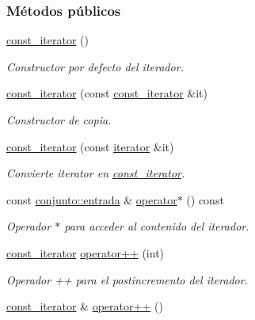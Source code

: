 \subsubsection*{Métodos públicos}
\begin{DoxyCompactItemize}
\item 
\hyperlink{classconjunto_1_1const__iterator_a9a4edb6eaa3bd1b3e3fab6111b5ebde9}{const\-\_\-iterator} ()
\begin{DoxyCompactList}\small\item\em Constructor por defecto del iterador. \end{DoxyCompactList}\item 
\hyperlink{classconjunto_1_1const__iterator_a1202d781e6061a7ce3bd9007b746f20a}{const\-\_\-iterator} (const \hyperlink{classconjunto_1_1const__iterator}{const\-\_\-iterator} \&it)
\begin{DoxyCompactList}\small\item\em Constructor de copia. \end{DoxyCompactList}\item 
\hyperlink{classconjunto_1_1const__iterator_ae54dfe6616579cac1d72c771766e5683}{const\-\_\-iterator} (const \hyperlink{classconjunto_1_1iterator}{iterator} \&it)
\begin{DoxyCompactList}\small\item\em Convierte iterator en \hyperlink{classconjunto_1_1const__iterator}{const\-\_\-iterator}. \end{DoxyCompactList}\item 
const \hyperlink{classconjunto_a09cad766dd65de73e51eae21f9d22585}{conjunto\-::entrada} \& \hyperlink{classconjunto_1_1const__iterator_aa8c859e2f061a5d8beac12b1fb41bbdb}{operator$\ast$} () const 
\begin{DoxyCompactList}\small\item\em Operador $\ast$ para acceder al contenido del iterador. \end{DoxyCompactList}\item 
\hyperlink{classconjunto_1_1const__iterator}{const\-\_\-iterator} \hyperlink{classconjunto_1_1const__iterator_a2cd2caa5e80305a5cfd5e49fc4179b63}{operator++} (int)
\begin{DoxyCompactList}\small\item\em Operador ++ para el postincremento del iterador. \end{DoxyCompactList}\item 
\hyperlink{classconjunto_1_1const__iterator}{const\-\_\-iterator} \& \hyperlink{classconjunto_1_1const__iterator_a29d5242e188de6305f5054054c13179d}{operator++} ()

\end{DoxyCompactItemize}
